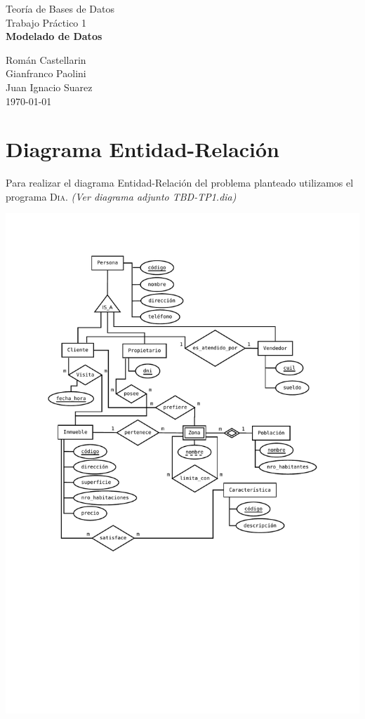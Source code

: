 \documentclass[12pt]{article}
\begin{document}
\begin{titlepage}
\vspace{0.5cm}

\begin{center}
\normalsize{\sc Teoría de Bases de Datos}\\
\vspace{0.5cm}
\large{Trabajo Práctico 1}\\

\Large{\bf Modelado de Datos}\\
\vspace{5cm}

\normalsize
Román Castellarin\\
Gianfranco Paolini\\
Juan Ignacio Suarez\\


\vspace*{0.5cm}
\small{ \today }


\end{center}
\end{titlepage}
\newpage
\section{Diagrama Entidad-Relación}
Para realizar el diagrama Entidad-Relación del problema planteado utilizamos el programa \textsc{Dia}.
\textit{(Ver diagrama adjunto TBD-TP1.dia)}


\includegraphics[width=\textwidth]{ERD.pdf}
\end{document}
